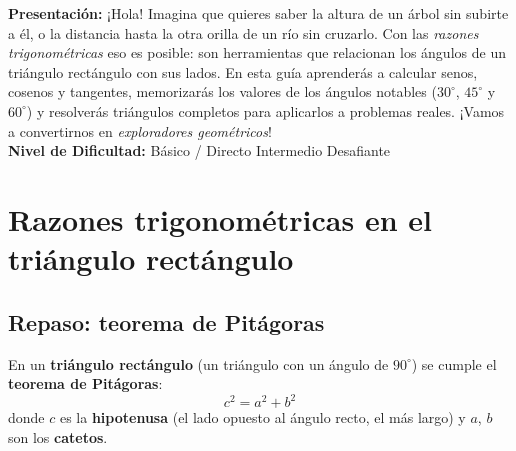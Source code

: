 \documentclass[12pt, letterpaper]{article}
\begin{document}


\vspace{4pt}
\begin{cuadroinfo}
  \small
  \textbf{Presentación:} ¡Hola! Imagina que quieres saber la altura de un árbol sin subirte a él, o la distancia hasta la otra orilla de un río sin cruzarlo. Con las \emph{razones trigonométricas} eso es posible: son herramientas que relacionan los ángulos de un triángulo rectángulo con sus lados. En esta guía aprenderás a calcular senos, cosenos y tangentes, memorizarás los valores de los ángulos notables ($30^{\circ}$, $45^{\circ}$ y $60^{\circ}$) y resolverás triángulos completos para aplicarlos a problemas reales. ¡Vamos a convertirnos en \emph{exploradores geométricos}!
  \\[4pt]
  \textbf{Nivel de Dificultad:}\quad
  \facil{} Básico / Directo \quad
  \medio{} Intermedio \quad
  \dificil{} Desafiante
\end{cuadroinfo}

\vspace{8pt}

\section{Razones trigonométricas en el triángulo rectángulo}

\subsection{Repaso: teorema de Pitágoras}

\begin{cuadroteoria}
  En un \textbf{triángulo rectángulo} (un triángulo con un ángulo de $90^{\circ}$) se cumple el \textbf{teorema de Pitágoras}:
  $$c^2 = a^2 + b^2$$
  donde $c$ es la \textbf{hipotenusa} (el lado opuesto al ángulo recto, el más largo) y $a$, $b$ son los \textbf{catetos}.

  \begin{center}
  \end{center}
\end{cuadroteoria}
\end{document}
